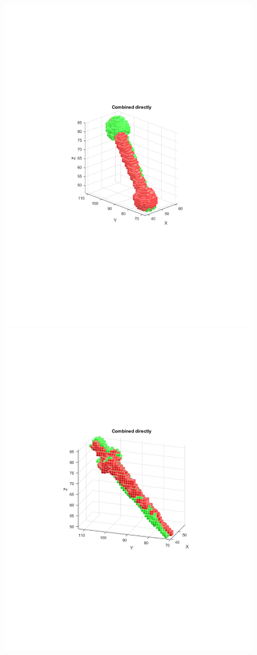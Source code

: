 \documentclass{UCF_ETD}
\begin{document}
\begin{figure}[H]
\begin{center}
\includegraphics[scale=0.35]{RobustRegistration/NoiselessAnomaliesResult6}
\includegraphics[scale=0.35]{RobustRegistration/NoiselessAnomaliesResult7}

\end{center}
\end{figure}
\end{document}
